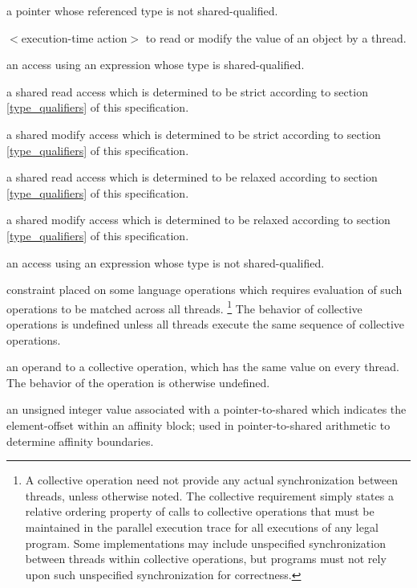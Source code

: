 %
     a pointer whose referenced type is not
     shared-qualified.

\label{def-access}
%
     $<$execution-time action$>$ to read or
     modify the value of an object by a thread.

%
     an access using an expression whose type
     is shared-qualified.

%
     a shared read access which is determined to be
     strict according to section \ref{type_qualifiers} of this specification.

%
     a shared modify access which is determined to be
     strict according to section \ref{type_qualifiers} of this specification.

%
     a shared read access which is determined to be
     relaxed according to section \ref{type_qualifiers} of this specification.

%
     a shared modify access which is determined to be
     relaxed according to section \ref{type_qualifiers} of this specification.

%
     an access using an expression whose type
     is not shared-qualified.

%
     constraint placed on some language 
     operations which requires evaluation of such operations to be
     matched across all threads.%
     \footnote{A collective operation need not provide any
     actual synchronization between threads, unless otherwise noted.
     The collective requirement simply states a relative ordering property
     of calls to collective operations that must be maintained in the
     parallel execution trace for all executions of any legal program.
     Some implementations may include unspecified synchronization between
     threads within collective operations, but programs must not rely upon
     such unspecified synchronization for correctness.}%
     The behavior of collective operations is undefined unless all threads
     execute the same sequence of collective operations.

%
     an operand to a collective operation, which has
     the same value on every thread.  The behavior of the operation
     is otherwise undefined.

%
     an unsigned integer value associated with a
     pointer-to-shared which indicates the element-offset within an
     affinity block; used in pointer-to-shared arithmetic
     to determine affinity boundaries.

